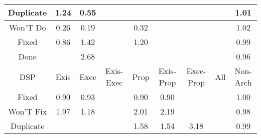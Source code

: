 \begin{tabular}{|c||c|c|c|c|c|c|c|c|}
\hline
Duplicate & \cellcolor[rgb]{0.8802072842891787,0.8258876609790846,0.42} 1.24 & \cellcolor[rgb]{0.8265067049371468,0.4447984033691615,0.34207292460800365} 0.55 &  &  &  &  &  & \cellcolor[rgb]{0.9087407593836839,0.8394035176027976,0.42} 1.01 \\ 
\hline
Won'T Do & \cellcolor[rgb]{0.7713714683099746,0.18382495000054644,0.290613370422643} 0.26 & \cellcolor[rgb]{0.76,0.13,0.28} 0.19 &  & \cellcolor[rgb]{0.7830565210948323,0.2391341998488728,0.30151941968851015} 0.32 &  &  &  & \cellcolor[rgb]{0.9070945669424647,0.8386237422359043,0.42} 1.02 \\ 
\hline
Fixed & \cellcolor[rgb]{0.8844780330837669,0.719196023263163,0.39617949754484905} 0.86 & \cellcolor[rgb]{0.85722044193553,0.8149991567063036,0.42} 1.42 &  & \cellcolor[rgb]{0.8847846010352535,0.8280558636482779,0.42} 1.20 &  &  &  & \cellcolor[rgb]{0.9082095985598211,0.8315254331831526,0.4183289586558329} 0.99 \\ 
\hline
Done &  & \cellcolor[rgb]{0.6999757934467161,0.7405148495273919,0.42} 2.68 &  &  &  &  &  & \cellcolor[rgb]{0.9028795653866649,0.8062966094968803,0.41335426102755385} 0.96 \\ 
\hline
\hline
DSP & Exis & Exec & Exis-Exec & Prop & Exis-Prop & Exec-Prop & All & Non-Arch \\ 
\hline
Fixed & \cellcolor[rgb]{0.892211679837846,0.7558019512324706,0.40339756784865616} 0.90 & \cellcolor[rgb]{0.8965879259295695,0.7765161827332957,0.4074820642009316} 0.93 &  & \cellcolor[rgb]{0.8908751790743434,0.7494758476185586,0.4021501671360538} 0.90 & \cellcolor[rgb]{0.8917048800068427,0.7534030986990552,0.40292455467305316} 0.90 &  &  & \cellcolor[rgb]{0.9095094846498999,0.8397676506236368,0.42} 1.00 \\ 
\hline
Won'T Fix & \cellcolor[rgb]{0.7887307228735675,0.7825566582032687,0.41999999999999993} 1.97 & \cellcolor[rgb]{0.887084776241579,0.8291454203249585,0.42} 1.18 &  & \cellcolor[rgb]{0.7836579510308019,0.7801537662777482,0.41999999999999993} 2.01 & \cellcolor[rgb]{0.7611531387037217,0.7694935920175524,0.42} 2.19 &  &  & \cellcolor[rgb]{0.9059374806812502,0.8207707418912508,0.41620831530250013} 0.98 \\ 
\hline
Duplicate &  &  &  & \cellcolor[rgb]{0.8376295145269516,0.8057192437232927,0.42} 1.58 & \cellcolor[rgb]{0.8427052696174062,0.8081235487661397,0.42} 1.54 & \cellcolor[rgb]{0.6363418951699389,0.7103724766594448,0.42} 3.18 &  & \cellcolor[rgb]{0.908836355059651,0.834492080615681,0.4189139313890075} 0.99 \\ 

\end{tabular}
